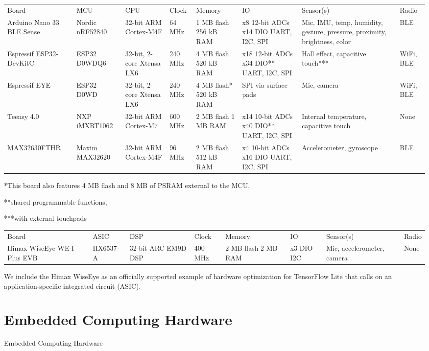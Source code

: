\begin{tabular}{llll llll}
    Board &	MCU &	CPU	& Clock &	Memory&	IO	& Sensor(s)&	Radio\\
    Arduino Nano 33 BLE Sense &	Nordic nRF52840 &	32-bit ARM Cortex-M4F &	64 MHz&	1 MB flash 256 kB RAM	& x8 12-bit ADCs x14 DIO UART, I2C, SPI &	Mic, IMU, temp, humidity, gesture, pressure, proximity, brightness, color	& BLE \\
    Espressif ESP32-DevKitC	& ESP32 D0WDQ6 &	32-bit, 2-core Xtensa LX6&	240 MHz&	4 MB flash 520 kB RAM &	x18 12-bit ADCs x34 DIO** UART, I2C, SPI &	Hall effect, capacitive touch***&	WiFi, BLE\\
    Espressif EYE&	ESP32 D0WD&	32-bit, 2-core Xtensa LX6&	240 MHz&	4 MB flash* 520 kB RAM &	SPI via surface pads&	Mic, camera&	WiFi, BLE\\
    Teensy 4.0&	NXP iMXRT1062&	32-bit ARM Cortex-M7&	600 MHz&	2 MB flash 1 MB RAM&	x14 10-bit ADCs x40 DIO** UART, I2C, SPI&	Internal temperature, capacitive touch&	None\\
    MAX32630FTHR&	Maxim MAX32620	&32-bit ARM Cortex-M4F&	96 MHz&	2 MB flash 512 kB RAM&	x4 10-bit ADCs x16 DIO UART, I2C, SPI&	Accelerometer, gyroscope&	BLE\\
\end{tabular}
    
    *This board also features 4 MB flash and 8 MB of PSRAM external to the MCU, 
    
    **shared programmable functions, 
    
    ***with external touchpads 
    
\begin{tabular}{llll llll}
    Board	&ASIC&	DSP	&Clock&	Memory&	IO&	Sensor(s)	& Radio\\
    Himax WiseEye WE-I Plus EVB&	HX6537-A&	32-bit ARC EM9D DSP&	400 MHz&	2 MB flash 2 MB RAM&	x3 DIO I2C&	Mic, accelerometer, camera	& None\\
\end{tabular}

    We include the Himax WiseEye as an officially supported example of hardware optimization for TensorFlow Lite that calls on an application-specific integrated circuit (ASIC).
    
\section{Embedded Computing Hardware}

Embedded Computing Hardware

